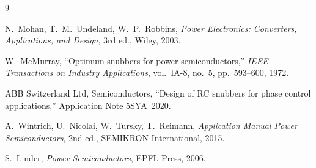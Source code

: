 \documentclass[11pt,a4paper]{article}
\begin{document}
\begin{thebibliography}{9}

 N.~Mohan, T.~M.~Undeland, W.~P.~Robbins,
\emph{Power Electronics: Converters, Applications, and Design},
3rd ed., Wiley, 2003.

 W.~McMurray,
``Optimum snubbers for power semiconductors,''
\emph{IEEE Transactions on Industry Applications},
vol.~IA-8, no.~5, pp.~593--600, 1972.

 ABB Switzerland Ltd, Semiconductors,
``Design of RC snubbers for phase control applications,''
Application Note 5SYA~2020.

 A.~Wintrich, U.~Nicolai, W.~Tursky, T.~Reimann,
\emph{Application Manual Power Semiconductors},
2nd ed., SEMIKRON International, 2015.

 S.~Linder,
\emph{Power Semiconductors}, EPFL Press, 2006.

\end{thebibliography}
\end{document}
